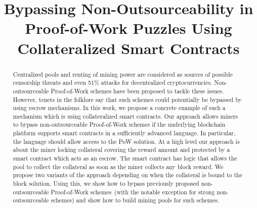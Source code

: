 \documentclass[11pt]{article}
\newcommand{\poolname}{ErgoPool\xspace}
\begin{document}
\title{Bypassing Non-Outsourceability in Proof-of-Work Puzzles Using Collateralized Smart Contracts}
\maketitle

\begin{abstract}
    Centralized pools and renting of mining power are considered as sources of possible censorship threats and even 51\%
    attacks for decentralized cryptocurrencies. Non-outsourceable Proof-of-Work schemes have been proposed to tackle these issues. However, tenets in the folklore say that such schemes could potentially be bypassed by using escrow mechanisms.
    In this work, we propose a concrete example of such a mechanism which is using collateralized smart contracts. Our approach allows miners to bypass non-outsourceable Proof-of-Work schemes
    if the underlying blockchain platform supports smart contracts in a sufficiently advanced language. In particular, the language
    should allow access to the PoW solution.
    At a high level our approach is about the miner locking collateral covering the reward amount and protected by a smart
    contract which acts as an escrow. The smart contract has logic that allows the pool to collect the collateral as soon as the miner collects any block reward. We propose two variants of the approach depending on when the collateral is bound to the block solution. Using this, we show how to bypass
    previously proposed non-outsourceable Proof-of-Work schemes~(with the notable exception for strong non-outsourceable schemes)
     and show how to build mining pools for such schemes.

\end{abstract}
\end{document}
